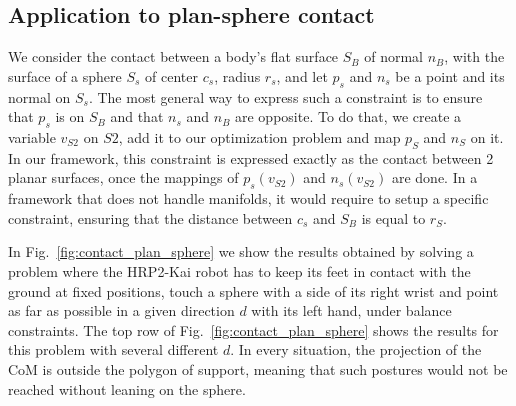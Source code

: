 

\subsection{Application to plan-sphere contact}
We consider the contact between a body's flat surface $S_B$ of normal $n_B$, with the surface of a sphere $S_s$ of center $c_s$, radius $r_s$, and let $p_s$ and $n_s$ be a point and its normal on $S_s$.
The most general way to express such a constraint is to ensure that $p_s$ is on $S_B$ and that $n_s$ and $n_B$ are opposite.
To do that, we create a variable $v_{S2}$ on $S2$, add it to our optimization problem and map $p_S$ and $n_S$ on it.
In our framework, this constraint is expressed exactly as the contact between 2 planar surfaces, once the mappings of $p_s(v_{S2})$ and $n_s(v_{S2})$ are done.
In a framework that does not handle manifolds, it would require to setup a specific constraint, ensuring that the distance between $c_s$ and $S_B$ is equal to $r_S$.

In Fig.~\ref{fig:contact_plan_sphere} we show the results obtained by solving a problem where the HRP2-Kai robot has to keep its feet in contact with the ground at fixed positions, touch a sphere with a side of its right wrist and point as far as possible in a given direction $d$ with its left hand, under balance constraints.
The top row of Fig.~\ref{fig:contact_plan_sphere} shows the results for this problem with several different $d$.
In every situation, the projection of the CoM is outside the polygon of support, meaning that such postures would not be reached without leaning on the sphere.


